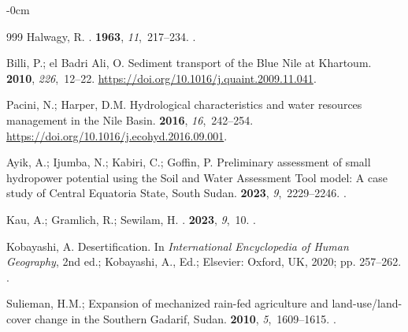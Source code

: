 \documentclass[jimaging,article,accept,pdftex,moreauthors]{Definitions/mdpi}
\begin{document}
\begin{adjustwidth}{-\extralength}{0cm}
\begin{thebibliography}{999}
Halwagy, R.
.
 {\bf 1963}, {\em 11},~217--234.
.

Billi, P.; {el Badri Ali}, O.
\newblock Sediment transport of the Blue Nile at Khartoum.
 {\bf 2010}, {\em 226},~12--22.
 {\url{https://doi.org/10.1016/j.quaint.2009.11.041}}.

Pacini, N.; Harper, D.M.
\newblock Hydrological characteristics and water resources management in the
  Nile Basin.
 {\bf 2016}, {\em 16},~242--254.
\newblock %
  {\url{https://doi.org/10.1016/j.ecohyd.2016.09.001}}.

Ayik, A.; Ijumba, N.; Kabiri, C.; Goffin, P.
\newblock Preliminary assessment of small hydropower potential using the Soil and Water Assessment Tool model: A case study of Central Equatoria State, South Sudan.
 {\bf 2023}, {\em 9},~2229--2246.
.

Kau, A.; Gramlich, R.; Sewilam, H.
.
 {\bf 2023}, {\em 9},~10.
.

Kobayashi, A.
\newblock Desertification. In {\em International Encyclopedia of Human
  Geography}, 2nd ed.;  Kobayashi, A., Ed.;
  Elsevier: Oxford, UK, 2020; pp. 257--262.
.

Sulieman, H.M.;  %
\newblock Expansion of mechanized rain-fed agriculture and land-use/land-cover
  change in the Southern Gadarif, Sudan.
 {\bf 2010}, {\em
  5},~1609--1615.
.


\end{thebibliography}
\end{adjustwidth}
\end{document}
